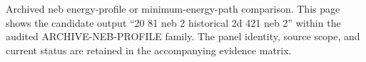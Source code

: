 Archived neb energy-profile or minimum-energy-path comparison. This page shows the candidate output ``20 81 neb 2 historical 2d 421 neb 2'' within the audited ARCHIVE-NEB-PROFILE family. The panel identity, source scope, and current status are retained in the accompanying evidence matrix.
